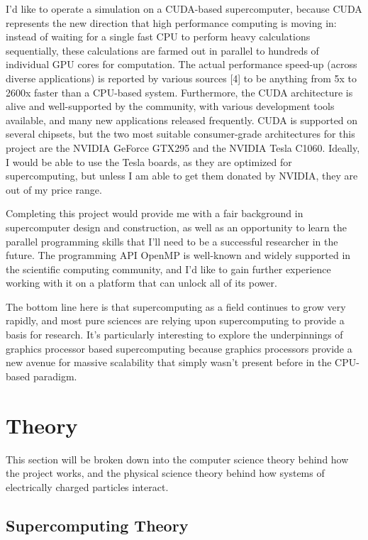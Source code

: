 \documentclass[10pt]{article}
\begin{document}
I'd like to operate a simulation on a CUDA-based supercomputer, because CUDA represents the new direction that high performance computing is moving in: instead of waiting for a single fast CPU to perform heavy calculations sequentially, these calculations are farmed out in parallel to hundreds of individual GPU cores for computation. The actual performance speed-up (across diverse applications) is reported by various sources [4] to be anything from 5x to 2600x faster than a CPU-based system.  Furthermore, the CUDA architecture is alive and well-supported by the community, with various development tools available, and many new applications released frequently. CUDA is supported on several chipsets, but the two most suitable consumer-grade architectures for this project are the NVIDIA GeForce GTX295 and the NVIDIA Tesla C1060. Ideally, I would be able to use the Tesla boards, as they are optimized for supercomputing, but unless I am able to get them donated by NVIDIA, they are out of my price range.

Completing this project would provide me with a fair background in supercomputer design and construction, as well as an opportunity to learn the parallel programming skills that I'll need to be a successful researcher in the future. The programming API OpenMP is well-known and widely supported in the scientific computing community, and I'd like to gain further experience working with it on a platform that can unlock all of its power.

The bottom line here is that supercomputing as a field continues to grow very rapidly, and most pure sciences are relying upon supercomputing to provide a basis for research. It's particularly interesting to explore the underpinnings of graphics processor based supercomputing because graphics processors provide a new avenue for massive scalability that simply wasn't present before in the CPU-based paradigm.

\section{Theory}
This section will be broken down into the computer science theory behind how the project works, and the physical science theory behind how systems of electrically charged particles interact.

\subsection{Supercomputing Theory}
\end{document}
